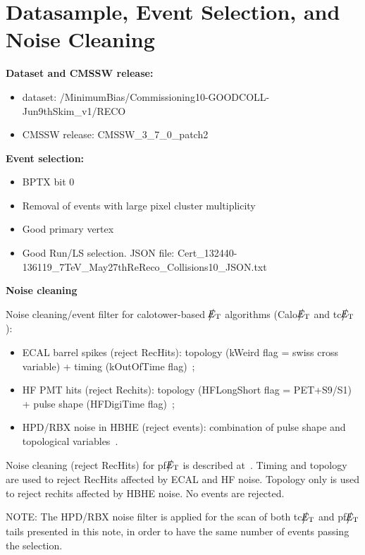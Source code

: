 \section{Datasample, Event Selection, and Noise Cleaning} \label{sec:EventSelection}

{\bf Dataset and CMSSW release:}
\begin{itemize}
\item dataset: /MinimumBias/Commissioning10-GOODCOLL-Jun9thSkim\_v1/RECO
\item CMSSW release: CMSSW\_3\_7\_0\_patch2
\end{itemize}

{\bf Event selection:}
\begin{itemize}
\item BPTX bit 0
\item Removal of events with large pixel cluster multiplicity
\item Good primary vertex
\item Good Run/LS selection. JSON file: Cert\_132440-136119\_7TeV\_May27thReReco\_Collisions10\_JSON.txt  
\end{itemize}

{\bf Noise cleaning}

Noise cleaning/event filter for calotower-based $\big\slash\hspace{-1.6ex}{E_\text{T}}$ algorithms (Calo$\big\slash\hspace{-1.6ex}{E_\text{T}}$ and tc$\big\slash\hspace{-1.6ex}{E_\text{T}}$):
\begin{itemize}
\item ECAL barrel spikes (reject RecHits): topology (kWeird flag = swiss cross variable) + timing (kOutOfTime flag)~\cite{ECALAt7TeV};
\item HF PMT hits (reject Rechits): topology (HFLongShort flag = PET+S9/S1) + pulse shape (HFDigiTime flag)~\cite{HFDN};
\item HPD/RBX noise in HBHE (reject events): combination of pulse shape and topological variables~\cite{HCALWGNOTE}.
\end{itemize}

Noise cleaning (reject RecHits) for pf$\big\slash\hspace{-1.6ex}{E_\text{T}}$ is described at~\cite{PFPAS2010}. Timing and topology are used to reject RecHits 
affected by ECAL and HF noise. Topology only is used to reject rechits affected by HBHE noise. No events are rejected.

NOTE: The HPD/RBX noise filter is applied for the scan of both tc$\big\slash\hspace{-1.6ex}{E_\text{T}}$ and pf$\big\slash\hspace{-1.6ex}{E_\text{T}}$ tails presented in this note, 
in order to have the same number of events passing the selection.

